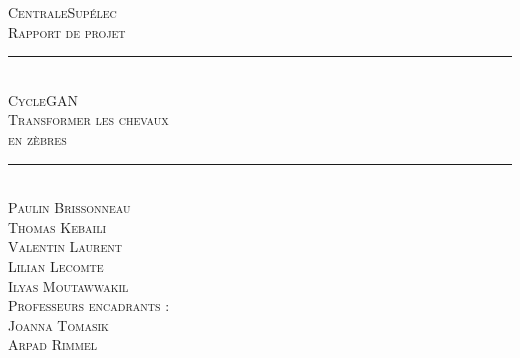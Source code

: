 \documentclass[a4paper]{report}
\newcommand{\HRule}{\rule{\linewidth}{0.5mm}}
\begin{document}
\begin{titlepage}
  \begin{sffamily}
  \begin{center}

    \textsc{\Large CentraleSupélec}\\[2cm]
    
    \textsc{\huge Rapport de projet}\\[1cm]

	\HRule \\[0.55cm]
    \textsc{\Huge CycleGAN \\[0.2cm] \huge Transformer les chevaux\\en zèbres}\\[0.6cm]
	\HRule \\[3cm]
    
 
  
    \textsc{\large Paulin Brissonneau\\
    	Thomas Kebaili\\
    	Valentin Laurent\\
    	Lilian Lecomte\\
    	Ilyas Moutawwakil}\\[1cm]
        
    \textsc{\large Professeurs encadrants :\\
        Joanna Tomasik\\
        Arpad Rimmel}\\


    \vfill

  \end{center}
  \end{sffamily}
\end{titlepage}



\tableofcontents








\newpage



\end{document}
